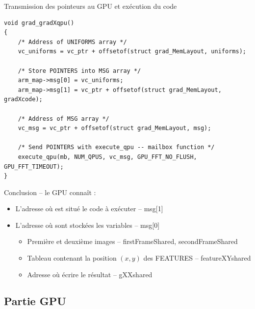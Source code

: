 \documentclass{bredelebeamer}
\begin{document}
\begin{frame}[fragile]{Transmission des pointeurs au GPU et exécution du code}

\begin{lstlisting}
void grad_gradXqpu()
{
    /* Address of UNIFORMS array */
    vc_uniforms = vc_ptr + offsetof(struct grad_MemLayout, uniforms);

    /* Store POINTERS into MSG array */
    arm_map->msg[0] = vc_uniforms;
    arm_map->msg[1] = vc_ptr + offsetof(struct grad_MemLayout, gradXcode);

    /* Address of MSG array */
    vc_msg = vc_ptr + offsetof(struct grad_MemLayout, msg);

    /* Send POINTERS with execute_qpu -- mailbox function */
    execute_qpu(mb, NUM_QPUS, vc_msg, GPU_FFT_NO_FLUSH, GPU_FFT_TIMEOUT);
}
\end{lstlisting}

\begin{alertblock}{Conclusion -- le GPU conna\^it :}
\begin{itemize}
\item L'adresse où est situé le code à exécuter -- msg[1]
\item L'adresse où sont stockées les variables -- msg[0]
	\begin{itemize}
		\item Première et deuxième images -- firstFrameShared, secondFrameShared
		\item Tableau contenant la position $(x,y)$ des FEATURES -- featureXYshared
		\item Adresse où écrire le résultat -- gXXshared
	\end{itemize}
\end{itemize}
\end{alertblock}

\end{frame}



\subsection{Partie GPU}

\end{document}
